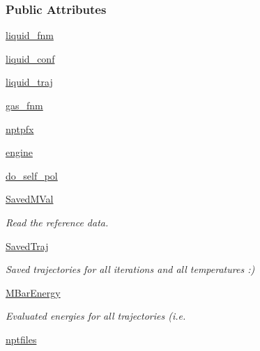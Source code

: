 \subsubsection*{Public Attributes}
\begin{DoxyCompactItemize}
\item 
\hyperlink{classforcebalance_1_1gmxio_1_1Liquid__GMX_a93aa835985645cb5bc38478923cb5696}{liquid\-\_\-fnm}
\item 
\hyperlink{classforcebalance_1_1gmxio_1_1Liquid__GMX_af86cd138d94f0d1ed8d70baf01976830}{liquid\-\_\-conf}
\item 
\hyperlink{classforcebalance_1_1gmxio_1_1Liquid__GMX_a3c56ce2033676d667a183772dbd9c050}{liquid\-\_\-traj}
\item 
\hyperlink{classforcebalance_1_1gmxio_1_1Liquid__GMX_a9a71d05c2c32e27dd94b1f917e20c685}{gas\-\_\-fnm}
\item 
\hyperlink{classforcebalance_1_1gmxio_1_1Liquid__GMX_a76010d532fa22a87abdd697ac4d03e8e}{nptpfx}
\item 
\hyperlink{classforcebalance_1_1gmxio_1_1Liquid__GMX_a2d5bd477173807422906188c4656f200}{engine}
\item 
\hyperlink{classforcebalance_1_1liquid_1_1Liquid_a2cf65dd56f058636e68a0b3bf2af210e}{do\-\_\-self\-\_\-pol}
\item 
\hyperlink{classforcebalance_1_1liquid_1_1Liquid_a5b9df1bf79a641156429e292f47b6afd}{Saved\-M\-Val}
\begin{DoxyCompactList}\small\item\em Read the reference data. \end{DoxyCompactList}\item 
\hyperlink{classforcebalance_1_1liquid_1_1Liquid_a0da0c00cdc193c9c470d7e528043fb99}{Saved\-Traj}
\begin{DoxyCompactList}\small\item\em Saved trajectories for all iterations and all temperatures \-:) \end{DoxyCompactList}\item 
\hyperlink{classforcebalance_1_1liquid_1_1Liquid_a6c00a87ae43f535118b77d41af51a5d7}{M\-Bar\-Energy}
\begin{DoxyCompactList}\small\item\em Evaluated energies for all trajectories (i.\-e. \end{DoxyCompactList}\item 
\hyperlink{classforcebalance_1_1liquid_1_1Liquid_a2030a7e21fcce59155a0258daed4f2f7}{nptfiles}
\item 

\end{DoxyCompactItemize}
